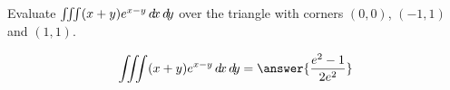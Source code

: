 \documentclass{ximera}
\author{David Guichard \and Neal Koblitz \and H. Jerome Keisler \and Albert Scheller \and Barry Balof \and Mike Wills \and Matthew Carr}
\begin{document}
\begin{exercise}




Evaluate $\iiint (x+y)e^{x-y} \mathop{}\!d\! x \mathop{}\!d\! y$ over the triangle with corners $(0,0)$, $(-1,1)$ and $(1,1)$.

\begin{prompt}
\[
\iiint (x+y)e^{x-y} \d x \d y=\answer{\frac{e^2-1}{2e^2}}
\]
\end{prompt}



\end{exercise}
\end{document}
